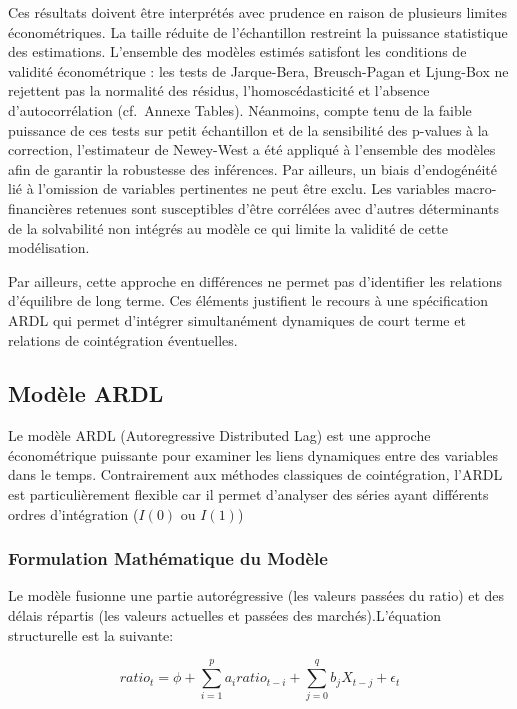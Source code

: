 \documentclass[
]{article}
\begin{document}
Ces résultats doivent être interprétés avec prudence en raison de
plusieurs limites économétriques. La taille réduite de l'échantillon
restreint la puissance statistique des estimations. L'ensemble des
modèles estimés satisfont les conditions de validité économétrique : les
tests de Jarque-Bera, Breusch-Pagan et Ljung-Box ne rejettent pas la
normalité des résidus, l'homoscédasticité et l'absence d'autocorrélation
(cf.~Annexe Tables). Néanmoins, compte tenu de la faible puissance de
ces tests sur petit échantillon et de la sensibilité des p-values à la
correction, l'estimateur de Newey-West a été appliqué à l'ensemble des
modèles afin de garantir la robustesse des inférences. Par ailleurs, un
biais d'endogénéité lié à l'omission de variables pertinentes ne peut
être exclu. Les variables macro-financières retenues sont susceptibles
d'être corrélées avec d'autres déterminants de la solvabilité non
intégrés au modèle ce qui limite la validité de cette modélisation.

Par ailleurs, cette approche en différences ne permet pas d'identifier
les relations d'équilibre de long terme. Ces éléments justifient le
recours à une spécification ARDL qui permet d'intégrer simultanément
dynamiques de court terme et relations de cointégration éventuelles.

\subsection{Modèle ARDL}\label{moduxe8le-ardl}

Le modèle ARDL (Autoregressive Distributed Lag) est une approche
économétrique puissante pour examiner les liens dynamiques entre des
variables dans le temps. Contrairement aux méthodes classiques de
cointégration, l'ARDL est particulièrement flexible car il permet
d'analyser des séries ayant différents ordres d'intégration (\(I(0)\) ou
\(I(1)\))

\subsubsection{Formulation Mathématique du
Modèle}\label{formulation-mathuxe9matique-du-moduxe8le}

Le modèle fusionne une partie autorégressive (les valeurs passées du
ratio) et des délais répartis (les valeurs actuelles et passées des
marchés).L'équation structurelle est la suivante:

\[ratio_{t} = \phi + \sum_{i=1}^{p} a_{i} ratio_{t-i} + \sum_{j=0}^{q} b_{j} X_{t-j} + \epsilon_{t}\]
\end{document}
